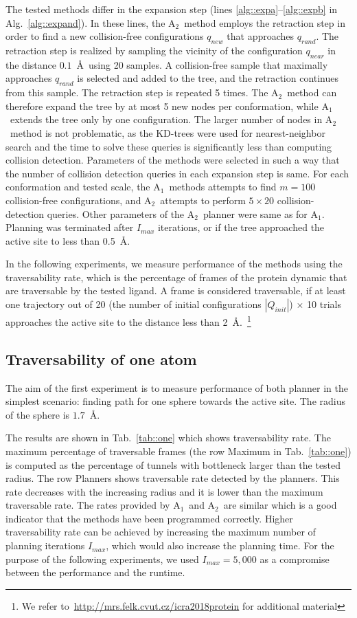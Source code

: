\documentclass[usletter, 10pt, conference]{ieeeconf} %
\def\qrand{q_{rand}}
\def\qnear{q_{near}}
\def\qnew{q_{new}}
\def\QI{Q_{init}}
\def\Imax{I_{max}} %
\def\RA{A$_{1}$}
\def\RB{A$_{2}$}
\begin{document}
The tested methods differ in the expansion step (lines \ref{alg::expa}--\ref{alg::expb} in Alg.~\ref{alg::expand}).
In these lines, the \RB\ method employs the retraction step in order to find a new collision-free configurations $\qnew$ that approaches $\qrand$.
The retraction step is realized by sampling the vicinity of the configuration $\qnear$ in the distance $0.1$~\AA\ using 20 samples.
A collision-free sample that maximally approaches $\qrand$ is selected and added to the tree, and the retraction continues from this sample.
The retraction step is repeated 5 times.
The \RB\ method can therefore expand the tree by at most 5 new nodes per conformation, while \RA\ extends the tree only by one configuration.
The larger number of nodes in \RB\ method is not problematic, as the KD-trees were used for nearest-neighbor search and the time to solve these queries is significantly less than computing collision detection.
Parameters of the methods were selected in such a way that the number of collision detection queries in each expansion step is same.
For each conformation and tested scale, the \RA\ methods attempts to find $m=100$ collision-free configurations, and \RB\ attempts to perform $5 \times 20$ collision-detection queries.
Other parameters of the \RB\ planner were same as for \RA.
Planning was terminated after $\Imax$ iterations, or if the tree approached the active site to less than 0.5~\AA.

In the following experiments, we measure performance of the methods using the traversability rate, which is the percentage of frames of the protein dynamic that are traversable by the tested ligand.
A frame is considered traversable, if at least one trajectory out of 20 (the number of initial configurations $|\QI|$) $\times$ 10 trials approaches the active site to the distance less than 2~\AA.~\footnote{We refer to~\url{http://mrs.felk.cvut.cz/icra2018protein} for additional material}

\subsection{Traversability of one atom}

The aim of the first experiment is to measure performance of both planner in the simplest scenario: finding path for one sphere towards the active site.
The radius of the sphere is $1.7$~\AA. 

The results are shown in Tab.~\ref{tab::one} which shows traversability rate. 
The maximum percentage of traversable frames (the row Maximum in Tab.~\ref{tab::one}) is computed as the percentage of tunnels with bottleneck larger than the tested radius.
The row Planners shows traversable rate detected by the planners.
This rate decreases with the increasing radius and it is lower than the maximum traversable rate.
The rates provided by \RA\ and \RB\ are similar which is a good indicator that the methods have been programmed correctly.
Higher traversability rate can be achieved by increasing the maximum number of planning iterations $\Imax$, which would also
increase the planning time.
For the purpose of the following experiments, we used $\Imax=5,000$ as a compromise between the performance and the runtime.
\end{document}
